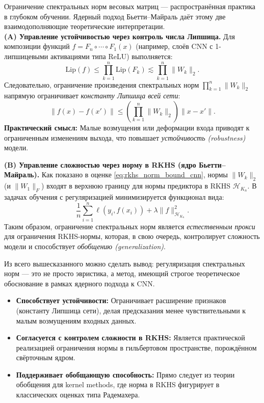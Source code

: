 \documentclass[../NDCNNAI_main.tex]{subfiles}
\begin{document}
Ограничение спектральных норм весовых матриц --- распространённая практика в глубоком обучении. Ядерный подход Бьетти--Майраль даёт этому две взаимодополняющие теоретические интерпретации.\\
\textbf{(A) Управление устойчивостью через контроль числа Липшица.}
Для композиции функций \( f = F_n \circ \cdots \circ F_1(x) \) (например, слоёв CNN с 1-липшицевыми активациями типа ReLU) выполняется:
\[
\mathrm{Lip}(f) \leq \prod_{k=1}^{n} \mathrm{Lip}(F_k) \lesssim \prod_{k=1}^{n} \| W_k \|_2.
\]
Следовательно, ограничение произведения спектральных норм \( \prod_{k=1}^{n} \| W_k \|_2 \) напрямую ограничивает \emph{константу Липшица всей сети}:
\[
\| f(x) - f(x') \| \leq \left( \prod_{k=1}^{n} \| W_k \|_2 \right) \| x - x' \|.
\]
\textbf{Практический смысл:} Малые возмущения или деформации входа приводят к ограниченным изменениям выхода, что повышает \emph{устойчивость (robustness)} модели.

\noindent
\textbf{(B) Управление сложностью через норму в RKHS (ядро Бьетти--Майраль).}
Как показано в оценке \eqref{eq:rkhs_norm_bound_cnn}, нормы \( \| W_k \|_2 \) (и \( \| W_1 \|_F \)) входят в верхнюю границу для нормы предиктора в RKHS \( \mathcal{H}_{K_n} \). В задачах обучения с регуляризацией минимизируется функционал вида:
\[
\frac{1}{n} \sum_{i=1}^{n} \ell(y_i, f(x_i)) + \lambda \| f \|^2_{\mathcal{H}_{K_n}}.
\]
Таким образом, ограничение спектральных норм является \emph{естественным прокси} для ограничения RKHS-нормы, которая, в свою очередь, контролирует сложность модели и способствует \emph{обобщению (generalization)}.

Из всего вышесказанного можно сделать вывод: регуляризация спектральных норм --- это не просто эвристика, а метод, имеющий строгое теоретическое обоснование в рамках ядерного подхода к CNN.
\begin{itemize}
    \item \textbf{Способствует устойчивости:} Ограничивает расширение признаков (константу Липшица сети), делая предсказания менее чувствительными к малым возмущениям входных данных.
    \item \textbf{Согласуется с контролем сложности в RKHS:} Является практической реализацией ограничения нормы в гильбертовом пространстве, порождённом свёрточным ядром.
    \item \textbf{Поддерживает обобщающую способность:} Прямо следует из теории обобщения для kernel methods, где норма в RKHS фигурирует в классических оценках типа Радемахера.
\end{itemize}
\end{document}
